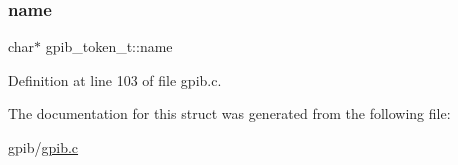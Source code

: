 \subsubsection{\texorpdfstring{name}{name}}
{\footnotesize\ttfamily char$\ast$ gpib\+\_\+token\+\_\+t\+::name}



Definition at line 103 of file gpib.\+c.



The documentation for this struct was generated from the following file\+:\begin{DoxyCompactItemize}
\item 
gpib/\hyperlink{gpib_8c}{gpib.\+c}\end{DoxyCompactItemize}
